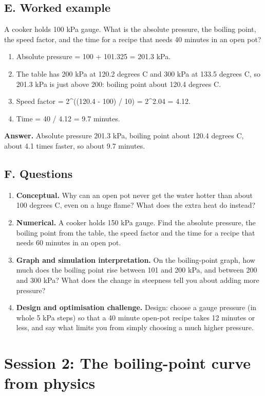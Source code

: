 \documentclass[11pt,a4paper]{article}
\begin{document}
\subsection*{E. Worked example}
A cooker holds 100 kPa gauge. What is the absolute pressure, the boiling point, the speed factor, and the time for a recipe that needs 40 minutes in an open pot?
\begin{enumerate}[nosep]
\item Absolute pressure = 100 + 101.325 = 201.3 kPa.
\item The table has 200 kPa at 120.2 degrees C and 300 kPa at 133.5 degrees C, so 201.3 kPa is just above 200: boiling point about 120.4 degrees C.
\item Speed factor = 2\textasciicircum{}((120.4 - 100) / 10) = 2\textasciicircum{}2.04 = 4.12.
\item Time = 40 / 4.12 = 9.7 minutes.
\end{enumerate}
\textbf{Answer.} Absolute pressure 201.3 kPa, boiling point about 120.4 degrees C, about 4.1 times faster, so about 9.7 minutes.

\subsection*{F. Questions}
\begin{enumerate}[nosep]
\item \textbf{Conceptual.} Why can an open pot never get the water hotter than about 100 degrees C, even on a huge flame? What does the extra heat do instead?
\item \textbf{Numerical.} A cooker holds 150 kPa gauge. Find the absolute pressure, the boiling point from the table, the speed factor and the time for a recipe that needs 60 minutes in an open pot.
\item \textbf{Graph and simulation interpretation.} On the boiling-point graph, how much does the boiling point rise between 101 and 200 kPa, and between 200 and 300 kPa? What does the change in steepness tell you about adding more pressure?
\item \textbf{Design and optimisation challenge.} Design: choose a gauge pressure (in whole 5 kPa steps) so that a 40 minute open-pot recipe takes 12 minutes or less, and say what limits you from simply choosing a much higher pressure.
\end{enumerate}

\section{Session 2: The boiling-point curve from physics}
\end{document}
